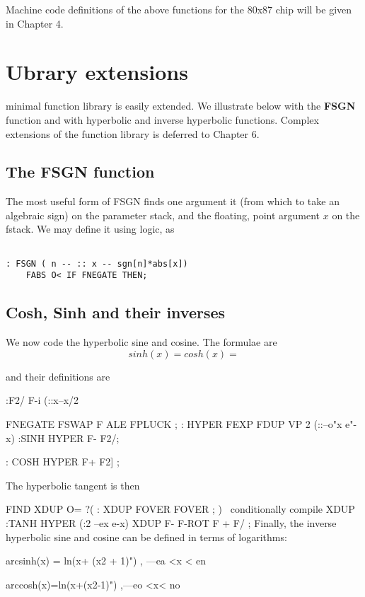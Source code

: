 Machine code definitions of the above functions for the 80x87
chip will be given in Chapter 4.

\section{Ubrary extensions}

 minimal function library is easily extended. We illustrate
below with the \textbf{FSGN} function and with hyperbolic and inverse hyperbolic
functions. Complex extensions of the function
library is deferred to Chapter 6.

\subsection{The FSGN function}
The most useful form of FSGN finds one argument it (from which
to take an algebraic sign) on the parameter stack, and the floating,
point argument $x$ on the fstack. We may define it using logic, as
\begin{verbatim}

: FSGN ( n -- :: x -- sgn[n]*abs[x])
	FABS O< IF FNEGATE THEN;
\end{verbatim}

\subsection{Cosh, Sinh and their inverses}
We now code the hyperbolic sine and cosine. The formulae are
\begin{equation}

sinh(x) = %

cosh(x) = %
\end{equation}


and their definitions are

:F2/ F-i (::x--x/2

FNEGATE FSWAP F ALE FPLUCK ;
: HYPER FEXP FDUP VP 2 (::--o"x e"-x)
:SINH HYPER F- F2/;

: COSH HYPER F+ F2] ;

The hyperbolic tangent is then

FIND XDUP O= ?( : XDUP FOVER FOVER ; )
\ conditionally compile XDUP
:TANH HYPER (:2 --ex e-x)
XDUP F- F-ROT F + F/ ;
Finally, the inverse hyperbolic sine and cosine can be defined in
terms of logarithms:

arcsinh(x) = ln(x+ (x2 + 1)") , —ea <x < en

arccosh(x)=ln(x+(x2-1)") ,—eo <x< no

